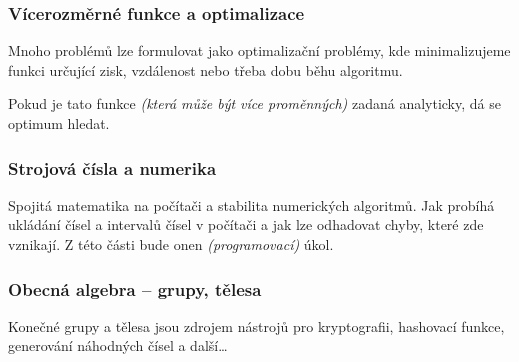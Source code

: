 \subsubsection*{Vícerozměrné funkce a optimalizace}

Mnoho problémů lze formulovat jako optimalizační problémy, kde minimalizujeme funkci určující zisk, vzdálenost nebo třeba dobu běhu algoritmu.

Pokud je tato funkce \textit{(která může být více proměnných)} zadaná analyticky, dá se optimum hledat.

\subsubsection*{Strojová čísla a numerika}

Spojitá matematika na počítači a stabilita numerických algoritmů. Jak probíhá ukládání čísel a intervalů čísel v počítači a jak lze odhadovat chyby, které zde vznikají. Z této části bude onen \textit{(programovací)} úkol.

\subsubsection*{Obecná algebra -- grupy, tělesa}

Konečné grupy a tělesa jsou zdrojem nástrojů pro kryptografii, hashovací funkce, generování náhodných čísel a další\ldots
